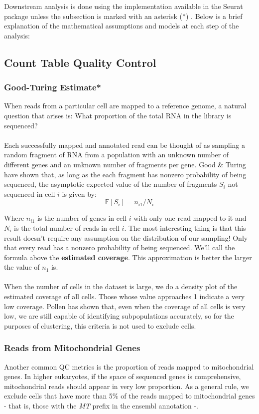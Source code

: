 Downstream analysis is done using the implementation available in the Seurat\cite{satija2015spatial} package unless the subsection is marked with an asterisk (*) . Below is a brief explanation of the mathematical assumptions and models at each step of the analysis:

\subsection{Count Table Quality Control}
\subsubsection{Good-Turing Estimate*}
When reads from a particular cell are mapped to a reference genome, a natural question that arises is: What proportion of the total RNA in the library is sequenced? \\
\\
Each successfully mapped and annotated read can be thought of as sampling a random fragment of RNA from a population with an unknown number of different genes and an unknown number of fragments per gene. Good \& Turing \cite{good1953population} have shown that, as long as the each fragment has nonzero probability of being sequenced, the asymptotic expected value of the number of fragments $S_i$ not sequenced in cell $i$ is given by:
$$
\mathbb{E}[S_i] = n_{i1} / N_i
$$

Where $n_{i1}$ is the number of genes in cell $i$ with only one read mapped to it and $N_i$ is the total number of reads in cell $i$. The most interesting thing is that this result doesn't require any assumption on the distribution of our sampling! Only that every read has a nonzero probability of being sequenced. We'll call the formula above the \textbf{estimated coverage}. This approximation is better the larger the value of $n_1$ is. \\
\\
When the number of cells in the dataset is large, we do a density plot of the estimated coverage of all cells. Those whose value approaches 1 indicate a very low coverage. Pollen \cite{pollen2014low} has shown that, even when the coverage of all cells is very low, we are still capable of identifying subpopulations accurately, so for the purposes of clustering, this criteria is not used to exclude cells.

\subsubsection{Reads from Mitochondrial Genes}
Another common QC metrics is the proportion of reads mapped to mitochondrial genes. In higher eukaryotes, if the space of sequenced genes is comprehensive, mitochondrial reads should appear in very low proportion. As a general rule, we exclude cells that have more than 5\% of the reads mapped to mitochondrial genes - that is, those with the \emph{MT} prefix in the ensembl annotation -.

